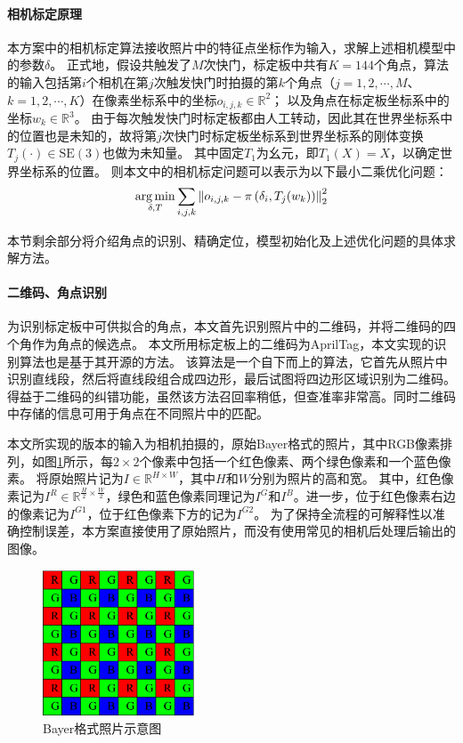 \paragraph{相机标定原理}本方案中的相机标定算法接收照片中的特征点坐标作为输入，求解上述相机模型中的参数$\delta$。
正式地，假设共触发了$M$次快门，标定板中共有$K=144$个角点，算法的输入包括第$i$个相机在第$j$次触发快门时拍摄的第$k$个角点（$j = 1,2,\cdots,M$、$k = 1,2,\cdots,K$）在像素坐标系中的坐标$o_{i,j,k}\in \mathbb{R}^2$；
以及角点在标定板坐标系中的坐标$w_k\in \mathbb{R}^3$。
由于每次触发快门时标定板都由人工转动，因此其在世界坐标系中的位置也是未知的，故将第$j$次快门时标定板坐标系到世界坐标系的刚体变换$T_{j}(\cdot)\in \mathrm{SE(3)}$也做为未知量。
其中固定$T_{1}$为幺元，即$T_{1}(X) = X$，以确定世界坐标系的位置。
则本文中的相机标定问题可以表示为以下最小二乘优化问题：
\begin{equation}
    \label{eq:calib_opt}
    \operatorname*{arg\,min}_{\delta,T} \sum_{i,j,k} \left\| o_{i,j,k} - \pi\left(\delta_i, T_j(w_k)\right) \right\|_2^2
\end{equation}

本节剩余部分将介绍角点的识别、精确定位，模型初始化及上述优化问题的具体求解方法。

\paragraph{二维码、角点识别}为识别标定板中可供拟合的角点，本文首先识别照片中的二维码，并将二维码的四个角作为角点的候选点。
本文所用标定板上的二维码为AprilTag，本文实现的识别算法也是基于其开源的方法\cite{AprilTag}。
该算法是一个自下而上的算法，它首先从照片中识别直线段，然后将直线段组合成四边形，最后试图将四边形区域识别为二维码。得益于二维码的纠错功能，虽然该方法召回率稍低，但查准率非常高。同时二维码中存储的信息可用于角点在不同照片中的匹配。

本文所实现的版本的输入为相机拍摄的，原始Bayer格式的照片，其中RGB像素排列，如图\ref{fig:bayer}所示，每$2\times 2$个像素中包括一个红色像素、两个绿色像素和一个蓝色像素。
将原始照片记为$I\in \mathbb{R}^{H\times W}$，其中$H$和$W$分别为照片的高和宽。
其中，红色像素记为$I^R\in \mathbb{R}^{\frac{H}{2}\times \frac{W}{2}}$，绿色和蓝色像素同理记为$I^G$和$I^B$。进一步，位于红色像素右边的像素记为$I^{G1}$，位于红色像素下方的记为$I^{G2}$。
为了保持全流程的可解释性以准确控制误差，本方案直接使用了原始照片，而没有使用常见的相机后处理后输出的图像。

\begin{figure}
    \centering
    \includegraphics[width=0.4\textwidth]{figures/bayer}
    \caption{Bayer格式照片示意图}
    \label{fig:bayer}
\end{figure}

